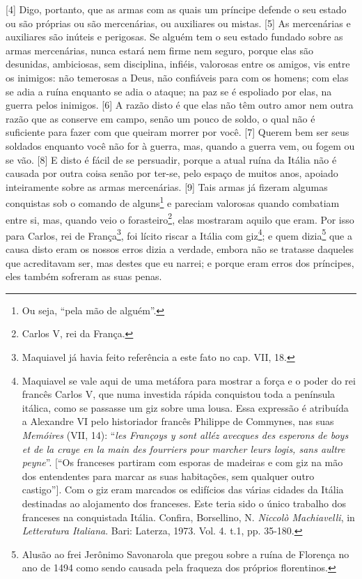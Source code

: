 {[}4{]} Digo, portanto, que as armas com as quais um príncipe defende o
seu estado ou são próprias ou são mercenárias, ou auxiliares ou mistas.
{[}5{]} As mercenárias e auxiliares são inúteis e perigosas. Se alguém
tem o seu estado fundado sobre as armas mercenárias, nunca estará nem
firme nem seguro, porque elas são desunidas, ambiciosas, sem disciplina,
infiéis, valorosas entre os amigos, vis entre os inimigos: não temerosas
a Deus, não confiáveis para com os homens; com elas se adia a ruína
enquanto se adia o ataque; na paz se é espoliado por elas, na guerra
pelos inimigos. {[}6{]} A razão disto é que elas não têm outro amor nem
outra razão que as conserve em campo, senão um pouco de soldo, o qual
não é suficiente para fazer com que queiram morrer por você. {[}7{]}
Querem bem ser seus soldados enquanto você não for à guerra, mas, quando
a guerra vem, ou fogem ou se vão. {[}8{]} E disto é fácil de se
persuadir, porque a atual ruína da Itália não é causada por outra coisa
senão por ter-se, pelo espaço de muitos anos, apoiado inteiramente sobre
as armas mercenárias. {[}9{]} Tais armas já fizeram algumas conquistas
sob o comando de alguns\footnote{Ou seja, ``pela mão de alguém''.} e
pareciam valorosas quando combatiam entre si, mas, quando veio o
forasteiro\footnote{Carlos V, rei da França.}, elas mostraram aquilo que
eram. Por isso para Carlos, rei de França\footnote{Maquiavel já havia
  feito referência a este fato no cap. VII, 18.}, foi lícito riscar a
Itália com giz\footnote{Maquiavel se vale aqui de uma metáfora para
  mostrar a força e o poder do rei francês Carlos V, que numa investida
  rápida conquistou toda a península itálica, como se passasse um giz
  sobre uma lousa. Essa expressão é atribuída a Alexandre VI pelo
  historiador francês Philippe de Commynes, nas suas \emph{Memóires}
  (VII, 14): ``\emph{les Françoys y sont alléz avecques des esperons de
  boys et de la craye en la main des fourriers pour marcher leurs logis,
  sans aultre peyne}''. {[}``Os franceses partiram com esporas de
  madeiras e com giz na mão dos entendentes para marcar as suas
  habitações, sem qualquer outro castigo''{]}. Com o giz eram marcados
  os edifícios das várias cidades da Itália destinadas ao alojamento dos
  franceses. Este teria sido o único trabalho dos franceses na
  conquistada Itália. Confira, Borsellino, N. \emph{Niccolò
  Machiavelli}, in \emph{Letteratura Italiana}. Bari: Laterza, 1973.
  Vol. 4. t.1, pp. 35-180.}; e quem dizia\footnote{Alusão ao frei
  Jerônimo Savonarola que pregou sobre a ruína de Florença no ano de
  1494 como sendo causada pela fraqueza dos próprios florentinos.} que a
causa disto eram os nossos erros dizia a verdade, embora não se tratasse
daqueles que acreditavam ser, mas destes que eu narrei; e porque eram
erros dos príncipes, eles também sofreram as suas penas.

